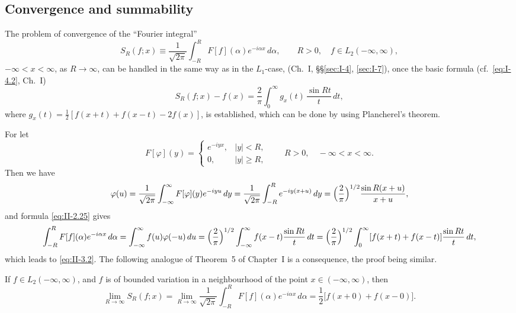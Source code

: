 \subsection*{Convergence and summability}
\noindent The problem of convergence of the ``Fourier integral''
\begin{equation}\tag{3.1}\label{eq:II-3.1}
S_{R}(f;x)\equiv \frac{1}{\sqrt{2\pi}}\int_{-R}^{R}F[f](\alpha)e^{-i\alpha x}\,d\alpha,\qquad R>0,\quad f\in L_{2}(-\infty,\infty),
\end{equation}
$-\infty<x<\infty$, as $R\to\infty$, can be handled in the same way as in the $L_{1}$-case, (Ch.~I, \S\S\ref{sec:I-4}, \ref{sec:I-7}), once the basic formula (cf.\ \eqref{eq:I-4.2}, Ch.~I)
\begin{equation}\tag{3.2}\label{eq:II-3.2}
S_{R}(f;x)-f(x)=\frac{2}{\pi}\int_{0}^{\infty}g_{x}(t)\,\frac{\sin Rt}{t}\,dt,
\end{equation}
where $g_{x}(t)=\frac{1}{2}[f(x+t)+f(x-t)-2f(x)]$, is established, which can be done by using Plancherel's theorem.

For let
\[
F[\varphi](y)=
\begin{cases}
e^{-iyx}, & |y|<R,\\
0, & |y|\ge R,
\end{cases}
\qquad R>0,\quad -\infty<x<\infty.
\]
Then we have
\[
\varphi(u)=\frac{1}{\sqrt{2\pi}}\int_{-\infty}^{\infty}F[\varphi](y)e^{-iyu}\,dy
=\frac{1}{\sqrt{2\pi}}\int_{-R}^{R}e^{-iy(x+u)}\,dy
=\Bigl(\frac{2}{\pi}\Bigr)^{1/2}\frac{\sin R(x+u)}{x+u},
\]
and formula \eqref{eq:II-2.25} gives
\[
\int_{-R}^{R}F[f](\alpha)e^{-i\alpha x}\,d\alpha
=\int_{-\infty}^{\infty}f(u)\varphi(-u)\,du
=\Bigl(\frac{2}{\pi}\Bigr)^{1/2}\int_{-\infty}^{\infty}f(x-t)\frac{\sin Rt}{t}\,dt
=\Bigl(\frac{2}{\pi}\Bigr)^{1/2}\int_{0}^{\infty}[f(x+t)+f(x-t)]\frac{\sin Rt}{t}\,dt,
\]
which leads to \eqref{eq:II-3.2}. The following analogue of Theorem~5 of Chapter~I is a consequence, the proof being similar.

\begin{theorem}\label{thm:II-2}
If $f\in L_{2}(-\infty,\infty)$, and $f$ is of bounded variation in a neighbourhood of the point $x\in(-\infty,\infty)$, then
\[
\lim_{R\to\infty}S_{R}(f;x)
=\lim_{R\to\infty}\frac{1}{\sqrt{2\pi}}\int_{-R}^{R}F[f](\alpha)e^{-i\alpha x}\,d\alpha
=\frac{1}{2}\bigl[f(x+0)+f(x-0)\bigr].
\]
\end{theorem}

